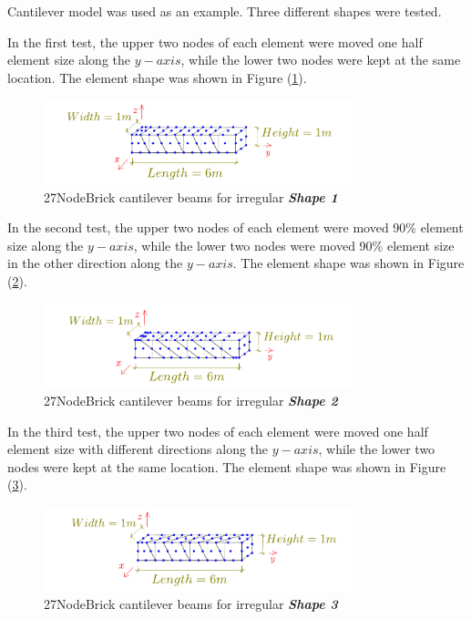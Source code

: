 \documentclass[fleqn,11pt,letter]{article}
\begin{document}
Cantilever model was used as an example. 
Three different shapes were tested. 


In the first test, the upper two nodes of each element were moved one half element size along the $y-axis$, while the lower two nodes were kept at the same location.  The element shape was shown in Figure (\ref{fig irregular shape 1 27NodeBrick cantilever beams }).

\begin{figure}[H]
  \centering
  \includegraphics[width=9cm]{../Figure_files/27NodeBrick/beam_brick27_shape1.pdf}
  \caption{27NodeBrick cantilever beams for irregular \textbf{\emph{Shape 1}} }
  \label{fig irregular shape 1 27NodeBrick cantilever beams }
\end{figure}


In the second test, the upper two nodes of each element were moved 90\% element size along the $y-axis$, while the lower two nodes were moved 90\% element size in the other direction along the $y-axis$. The element shape was shown in Figure (\ref{fig irregular shape 2 27NodeBrick cantilever beams }).

\begin{figure}[H]
  \centering
  \includegraphics[width=9cm]{../Figure_files/27NodeBrick/beam_brick27_shape2.pdf}
  \caption{27NodeBrick cantilever beams for irregular \textbf{\emph{Shape 2}} }
  \label{fig irregular shape 2 27NodeBrick cantilever beams }
\end{figure}



In the third test, the upper two nodes of each element were moved one half element size with different directions along the $y-axis$, while the lower two nodes were kept at the same location. The element shape was shown in Figure (\ref{fig irregular shape 3 27NodeBrick cantilever beams }).

\begin{figure}[H]
  \centering
  \includegraphics[width=9cm]{../Figure_files/27NodeBrick/beam_brick27_shape3.pdf}
  \caption{27NodeBrick cantilever beams for irregular \textbf{\emph{Shape 3}} }
  \label{fig irregular shape 3 27NodeBrick cantilever beams }
\end{figure}
\end{document}
